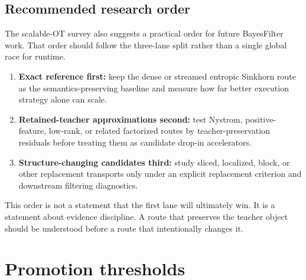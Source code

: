 \subsection{Recommended research order}
\label{sec:bf-dpf-debug-research-order}

The scalable-OT survey also suggests a practical order for future BayesFilter work.
That order should follow the three-lane split rather than a single global race for
runtime.
\begin{enumerate}[label=(\roman*)]
  \item \textbf{Exact reference first:} keep the dense or streamed entropic
    Sinkhorn route as the semantics-preserving baseline and measure how far better
    execution strategy alone can scale.
  \item \textbf{Retained-teacher approximations second:} test Nystrom,
    positive-feature, low-rank, or related factorized routes by
    teacher-preservation residuals before treating them as candidate drop-in
    accelerators.
  \item \textbf{Structure-changing candidates third:} study sliced, localized,
    block, or other replacement transports only under an explicit replacement
    criterion and downstream filtering diagnostics.
\end{enumerate}
This order is not a statement that the first lane will ultimately win.  It is a
statement about evidence discipline.  A route that preserves the teacher object
should be understood before a route that intentionally changes it.

\section{Promotion thresholds}
\label{sec:bf-dpf-debug-promotion-thresholds}

